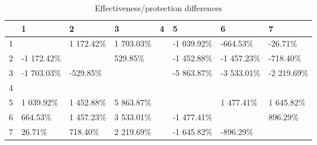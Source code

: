 \begin{table}[ht]
\centering
\begin{tabular}{rlllllll}
  \hline
 & 1 & 2 & 3 & 4 & 5 & 6 & 7 \\ 
  \hline
1 &  & 1 172.42\% & 1 703.03\% &  & -1 039.92\% & -664.53\% & -26.71\% \\ 
  2 & -1 172.42\% &  & 529.85\% &  & -1 452.88\% & -1 457.23\% & -718.40\% \\ 
  3 & -1 703.03\% & -529.85\% &  &  & -5 863.87\% & -3 533.01\% & -2 219.69\% \\ 
  4 &  &  &  &  &  &  &  \\ 
  5 & 1 039.92\% & 1 452.88\% & 5 863.87\% &  &  & 1 477.41\% & 1 645.82\% \\ 
  6 & 664.53\% & 1 457.23\% & 3 533.01\% &  & -1 477.41\% &  & 896.29\% \\ 
  7 & 26.71\% & 718.40\% & 2 219.69\% &  & -1 645.82\% & -896.29\% &  \\ 
   \hline
\end{tabular}
\caption{Effectiveness/protection differences} 
\end{table}
